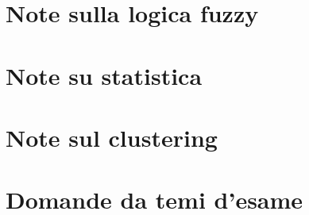 \providecommand{\main}{.}





{\hypersetup{hidelinks}
  \tableofcontents  %
}

\chapter{Note sulla logica fuzzy}


\chapter{Note su statistica}


\chapter{Note sul clustering}


\chapter{Domande da temi d'esame}


\clearpage

\clearpage

\clearpage

\clearpage

\clearpage

\clearpage

\clearpage

\clearpage




